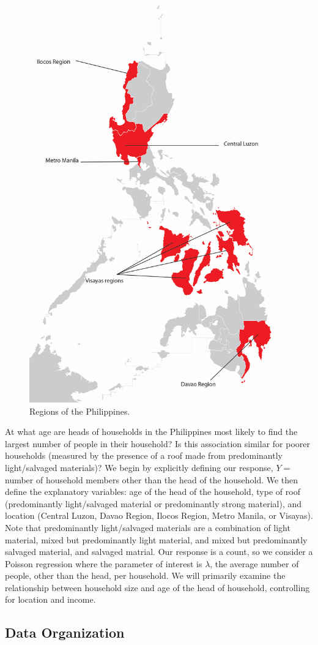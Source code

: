 \documentclass[
]{krantz}
\begin{document}
\begin{figure}

{\centering \includegraphics[width=0.5\linewidth]{data/map_of_philippines} 

}

\caption{Regions of the Philippines.}\label{fig:philippinesmap}
\end{figure}

At what age are heads of households in the Philippines most likely to find the largest number of people in their household? Is this association similar for poorer households (measured by the presence of a roof made from predominantly light/salvaged materials)? We begin by explicitly defining our response, \(Y=\) number of household members other than the head of the household. We then define the explanatory variables: age of the head of the household, type of roof (predominantly light/salvaged material or predominantly strong material), and location (Central Luzon, Davao Region, Ilocos Region, Metro Manila, or Visayas). Note that predominantly light/salvaged materials are a combination of light material, mixed but predominantly light material, and mixed but predominantly salvaged material, and salvaged matrial. Our response is a count, so we consider a Poisson regression where the parameter of interest is \(\lambda\), the average number of people, other than the head, per household. We will primarily examine the relationship between household size and age of the head of household, controlling for location and income.

\subsection{Data Organization}\label{organizedata4}
\end{document}
